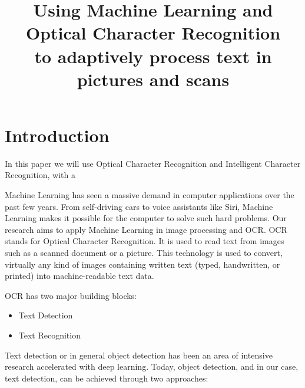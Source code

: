 \documentclass[conference]{IEEEtran}
\begin{document}
\title{Using Machine Learning and Optical Character Recognition\\to adaptively process text in pictures and scans}


\author{
\and
{}
}


\maketitle

\section{Introduction}\label{section:Introduction}
In this paper we will use Optical Character Recognition and Intelligent Character Recognition, with a 


Machine Learning has seen a massive demand in computer applications over the past few years. From self-driving cars to voice assistants like Siri, Machine Learning makes it possible for the computer to solve such hard problems. Our research aims to apply Machine Learning in image processing and OCR.
OCR stands for Optical Character Recognition. It is used to read text from images such as a scanned document or a picture. This technology is used to convert, virtually any kind of images containing written text (typed, handwritten, or printed) into machine-readable text data.

OCR has two major building blocks:

\begin{itemize}
	\item Text Detection
	\item Text Recognition
\end{itemize}

Text detection or in general object detection has been an area of intensive research accelerated with deep learning. Today, object detection, and in our case, text detection, can be achieved through two approaches:
\end{document}

